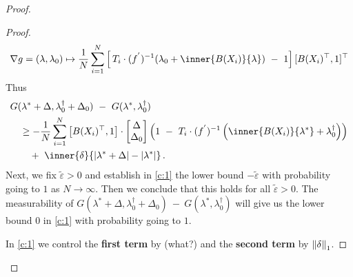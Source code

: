 \begin{proof}
\begin{proof}
  \begin{gather}
    \nabla
    g
    =
    (\lambda,\lambda_0)
    \mapsto
\frac{1}{N}
\sum_{i=1} 
  ^N
  \left[ 
    \,
  T_i
  \cdot
  (f^{'})^{-1}
  \!
  \left( 
\lambda_0
+
\inner
{B(X_i)}
{\lambda}
  \right)
  \ 
-
\ 
1
  \right]
  [
  B(X_i)^\top
  ,
  1
  ]^\top
  \end{gather}
  Thus
\begin{align}
  \label{c:1}
  \begin{split}
     &
   G
     (
     \lambda^*
      +
      \Delta
      ,
      \lambda^\dagger_0
      +
     \Delta_0
     )
     \ 
     -
     \ 
     G
     (
     \lambda^*,
      \lambda^\dagger_0
     )
     \\
     &
     \quad
     \ge
     -
     \frac{1}{N}
     \sum_{i=1}^{N} 
     \left[ 
       B(X_i)^\top,
       1
     \right]
     \cdot
     \begin{bmatrix}
       \Delta\\
       \Delta_0
     \end{bmatrix}
     \left( 
       1
       \ 
       -
       \ 
     T_i
     \cdot
     (f^{'})^{-1}
     \left( 
       \inner
       {B(X_i)}
       {\lambda^*}
       +
      \lambda^\dagger_0
     \right)
     \right)
     \\
     &
     \qquad
     +
     \ 
     \inner
     {\delta}
     {
       |\lambda^*+\Delta|
       -
       |\lambda^*|
     }
     \,.
   \end{split}
\end{align}
Next, we fix $
\tilde{\varepsilon}
>0
$
and establish in \eqref{c:1} the lower bound
$
-
\tilde{\varepsilon}
$
with probability going to $1$ as $N\to\infty$.
Then we conclude that this holds for all $\tilde{\varepsilon}>0$.
The measurability of
$
G
     (
     \lambda^*
      +
      \Delta
      ,
      \lambda^\dagger_0
      +
     \Delta_0
     )
     \ 
     -
     \ 
     G
     (
     \lambda^*,
      \lambda^\dagger_0
     )
$
will give us the lower bound 0 in \eqref{c:1} with probability going to $1$.

In \eqref{c:1} we control the \textbf{first term} by (what?) 
and the \textbf{second term} by $\left\lVert\delta\right\rVert_1$.

\end{proof}
\end{proof}
